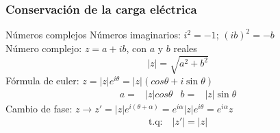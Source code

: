 \documentclass[%
xcolor=pdftex,dvipsnames,table%
]{beamer}
\begin{document}
\begin{frame}
  \frametitle{Conservación de la carga eléctrica}
   \hspace{0.8\textwidth} \only<2>{electrón}

  


\end{frame}


{
\begin{frame}[plain]
  \begin{block}{Números complejos}
  Números imaginarios: $i^2=-1$; $(ib)^2=-b$\\
  Número complejo: $z=a+ib$, con $a$ y $b$ reales\\
  \begin{equation*}
  |z|=\sqrt{a^2+b^2}  
  \end{equation*}
  Fórmula de euler: $z=|z|e^{i\theta}=|z|(cos\theta+i\sin\theta)$
  \begin{align*}
    a=&|z|cos\theta&b=&|z|\sin\theta
  \end{align*}
  Cambio de fase: $z\to z'=|z|e^{i(\theta+\alpha)}=e^{i\alpha}|z|e^{i\theta}=e^{i\alpha}z$
  \begin{align*}
    \text{t.q:}\quad|z'|=|z|
  \end{align*}

\vspace{2cm}
\quad
  \end{block}
\end{frame}
}
\end{document}
